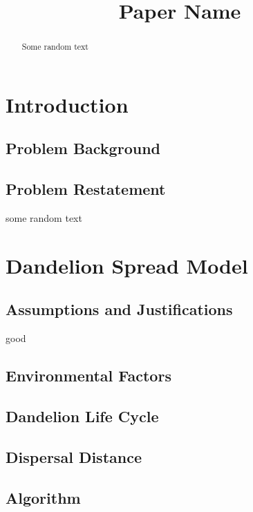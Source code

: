 \documentclass[12pt]{article}
\title{Paper Name}  %
\begin{document}
\begin{abstract}

	Some random text
	
\end{abstract}

\maketitle
\tableofcontents

\section{Introduction}

	\subsection{Problem Background}
	
	\subsection{Problem Restatement}
	
	some random text

\section{Dandelion Spread Model}

	\subsection{Assumptions and Justifications}
	
	good
	
	\subsection{Environmental Factors}
	
	\subsection{Dandelion Life Cycle}
	
	\subsection{Dispersal Distance}
	
	\subsection{Algorithm}
	
\end{document}
